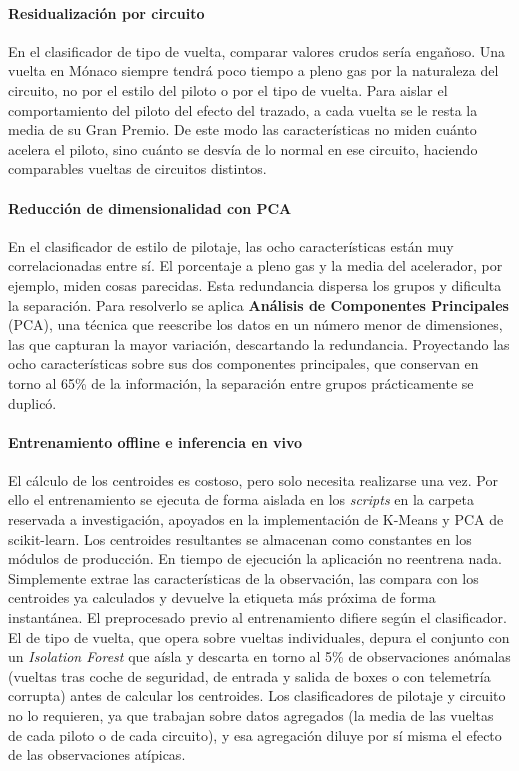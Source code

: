 \documentclass[12pt,a4paper,twoside,openright]{book}
\begin{document}
\paragraph{Residualización por circuito} En el clasificador de tipo de vuelta, comparar valores crudos sería engañoso. Una vuelta en Mónaco siempre tendrá poco tiempo a pleno gas por la naturaleza del circuito, no por el estilo del piloto o por el tipo de vuelta. Para aislar el comportamiento del piloto del efecto del trazado, a cada vuelta se le resta la media de su Gran Premio. De este modo las características no miden cuánto acelera el piloto, sino cuánto se desvía de lo normal en ese circuito, haciendo comparables vueltas de circuitos distintos.

\paragraph{Reducción de dimensionalidad con PCA} En el clasificador de estilo de pilotaje, las ocho características están muy correlacionadas entre sí. El porcentaje a pleno gas y la media del acelerador, por ejemplo, miden cosas parecidas. Esta redundancia dispersa los grupos y dificulta la separación. Para resolverlo se aplica \textbf{Análisis de Componentes Principales} (PCA), una técnica que reescribe los datos en un número menor de dimensiones, las que capturan la mayor variación, descartando la redundancia. Proyectando las ocho características sobre sus dos componentes principales, que conservan en torno al 65\% de la información, la separación entre grupos prácticamente se duplicó.

\paragraph{Entrenamiento offline e inferencia en vivo}
El cálculo de los centroides es costoso, pero solo necesita realizarse una vez. Por ello el entrenamiento se ejecuta de forma aislada en los \textit{scripts} en la carpeta reservada a investigación, apoyados en la implementación de K-Means y PCA de scikit-learn. Los centroides resultantes se almacenan como constantes en los módulos de producción. En tiempo de ejecución la aplicación no reentrena nada. Simplemente extrae las características de la observación, las compara con los centroides ya calculados y devuelve la etiqueta más próxima de forma instantánea.
El preprocesado previo al entrenamiento difiere según el clasificador. El de tipo de vuelta, que opera sobre vueltas individuales, depura el conjunto con un \textit{Isolation Forest} que aísla y descarta en torno al 5\% de observaciones anómalas (vueltas tras coche de seguridad, de entrada y salida de boxes o con telemetría corrupta) antes de calcular los centroides. Los clasificadores de pilotaje y circuito no lo requieren, ya que trabajan sobre datos agregados (la media de las vueltas de cada piloto o de cada circuito), y esa agregación diluye por sí misma el efecto de las observaciones atípicas.
\end{document}
